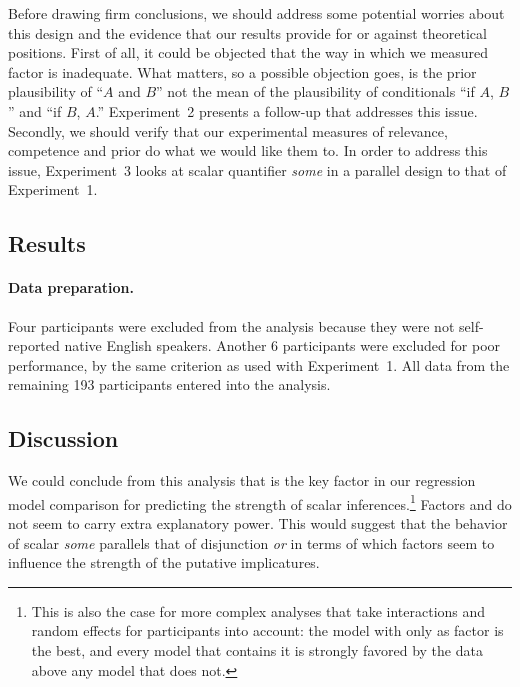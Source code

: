 \documentclass[12pt]{article}
\begin{document}
Before drawing firm conclusions, we should address some potential worries about this design and
the evidence that our results provide for or against theoretical positions. First of all, it
could be objected that the way in which we measured factor \pri is inadequate. What matters, so
a possible objection goes, is the prior plausibility of ``$A$ and $B$'' not the mean of the
plausibility of conditionals ``if $A$, $B$'' and ``if $B$, $A$.'' Experiment~2 presents a
follow-up that addresses this issue. Secondly, we should verify that our experimental measures
of relevance, competence and prior do what we would like them to. In order to address this
issue, Experiment~3 looks at scalar quantifier \emph{some} in a parallel design to that of
Experiment~1.



\subsection*{Results}

\paragraph{Data preparation.} Four participants were excluded from the analysis because they
were not self-reported native English speakers. Another 6 participants were excluded for poor
performance, by the same criterion as used with Experiment~1. All data from the remaining 193
participants entered into the analysis.



\subsection{Discussion}

We could conclude from this analysis that \pri is the key factor in our regression model
comparison for predicting the strength of scalar inferences.\footnote{This is also the case for
  more complex analyses that take interactions and random effects for participants into
  account: the model with only \pri as factor is the best, and every model that contains it is
  strongly favored by the data above any model that does not.} Factors \rel and \com do not
seem to carry extra explanatory power. This would suggest that the behavior of scalar
\emph{some} parallels that of disjunction \emph{or} in terms of which factors seem to influence
the strength of the putative implicatures. 
\end{document}
